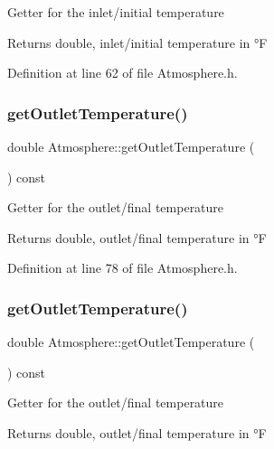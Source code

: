 Getter for the inlet/initial temperature \begin{DoxyReturn}{Returns}
double, inlet/initial temperature in °F 
\end{DoxyReturn}


Definition at line 62 of file Atmosphere.\+h.

\mbox{\label{class_atmosphere_a717e2dc78ebd13420f8f26707374dd3f}} 
\subsubsection{\texorpdfstring{get\+Outlet\+Temperature()}{getOutletTemperature()}\hspace{0.1cm}{\footnotesize\ttfamily [1/3]}}
{\footnotesize\ttfamily double Atmosphere\+::get\+Outlet\+Temperature (\begin{DoxyParamCaption}{ }\end{DoxyParamCaption}) const\hspace{0.3cm}{\ttfamily [inline]}}

Getter for the outlet/final temperature \begin{DoxyReturn}{Returns}
double, outlet/final temperature in °F 
\end{DoxyReturn}


Definition at line 78 of file Atmosphere.\+h.

\mbox{\label{class_atmosphere_a717e2dc78ebd13420f8f26707374dd3f}} 
\subsubsection{\texorpdfstring{get\+Outlet\+Temperature()}{getOutletTemperature()}\hspace{0.1cm}{\footnotesize\ttfamily [2/3]}}
{\footnotesize\ttfamily double Atmosphere\+::get\+Outlet\+Temperature (\begin{DoxyParamCaption}{ }\end{DoxyParamCaption}) const\hspace{0.3cm}{\ttfamily [inline]}}

Getter for the outlet/final temperature \begin{DoxyReturn}{Returns}
double, outlet/final temperature in °F 
\end{DoxyReturn}


